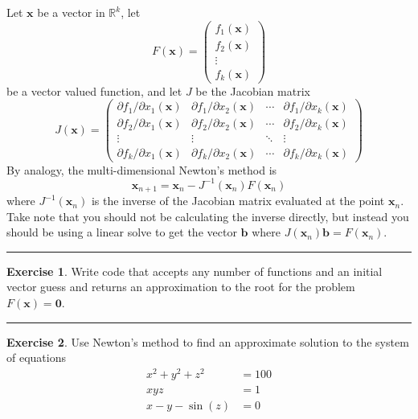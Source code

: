 \documentclass[
]{book}
\theoremstyle{definition}
\theoremstyle{definition}
\theoremstyle{definition}
\newtheorem{exercise}{Exercise}[chapter]
\theoremstyle{remark}
\begin{document}
Let \(\boldsymbol{x}\) be a vector in \(\mathbb{R}^k\), let
\[F(\boldsymbol{x}) = \begin{pmatrix} f_1(\boldsymbol{x}) \\ f_2(\boldsymbol{x}) \\ \vdots \\ f_k(\boldsymbol{x}) \end{pmatrix}\]
be a vector valued function, and let \(J\) be the Jacobian matrix
\[J(\boldsymbol{x}) = 
        \begin{pmatrix} \partial f_1 / \partial x_1(\boldsymbol{x}) & \partial f_1 / \partial
            x_2(\boldsymbol{x}) & \cdots
            & \partial f_1 / \partial x_k(\boldsymbol{x}) \\ 
         \partial f_2 / \partial x_1(\boldsymbol{x}) & \partial f_2 / \partial x_2(\boldsymbol{x}) & \cdots &
         \partial f_2 / \partial x_k(\boldsymbol{x}) \\ 
         \vdots & \vdots & \ddots & \vdots \\
         \partial f_k / \partial x_1(\boldsymbol{x}) & \partial f_k / \partial x_2(\boldsymbol{x}) & \cdots & \partial f_k /
     \partial x_k(\boldsymbol{x}) \end{pmatrix}\] By analogy, the multi-dimensional
Newton's method is \[\boldsymbol{x}_{n+1} = \boldsymbol{x}_n -  J^{-1}(\boldsymbol{x}_n)F(\boldsymbol{x}_n)\] where
\(J^{-1}(\boldsymbol{x}_n)\) is the inverse of the Jacobian matrix evaluated at the
point \(\boldsymbol{x}_n\). Take note that you should not be calculating the inverse directly, but instead you should be using a linear solve to get the vector \(\boldsymbol{b}\) where \(J(\boldsymbol{x}_n) \boldsymbol{b} = F(\boldsymbol{x}_n)\).

\begin{center}\rule{0.5\linewidth}{0.5pt}\end{center}

\begin{exercise}
\protect\hypertarget{exr:unnamed-chunk-857}{}{\label{exr:unnamed-chunk-857} }Write code that accepts any number of functions and an initial vector guess and returns an approximation to the root for the problem \(F(\boldsymbol{x}) = \boldsymbol{0}\).
\end{exercise}

\begin{center}\rule{0.5\linewidth}{0.5pt}\end{center}

\begin{exercise}
\protect\hypertarget{exr:unnamed-chunk-858}{}{\label{exr:unnamed-chunk-858} }Use Newton's method to find an approximate solution to the system of equations
\[\begin{aligned}
    x^2 + y^2 + z^2 &= 100 \\
    xyz &= 1 \\
    x - y - \sin(z) &= 0
\end{aligned}\]
\end{exercise}
\end{document}
